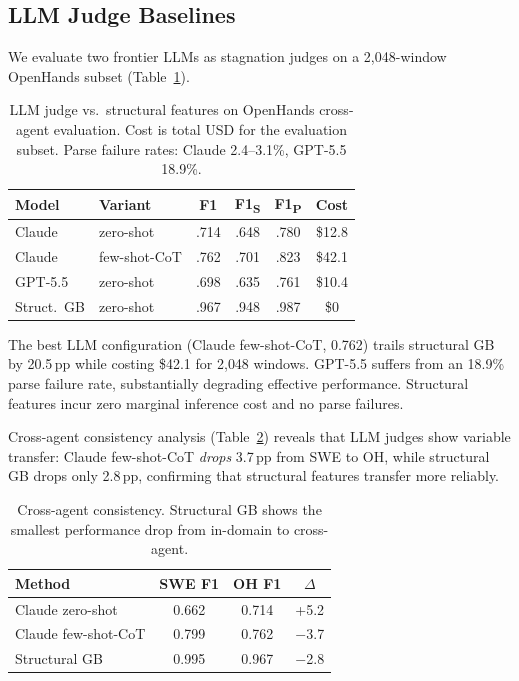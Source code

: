 \documentclass[11pt,a4paper]{article}
\begin{document}
\subsection{LLM Judge Baselines}
\label{sec:exp-llm}

We evaluate two frontier LLMs as stagnation judges on a 2{,}048-window OpenHands subset (Table~\ref{tab:llm}).

\begin{table}[t]
\centering
\small
\begin{tabular}{llcccc}
\toprule
\textbf{Model} & \textbf{Variant} & \textbf{F1} & \textbf{F1\textsubscript{S}} & \textbf{F1\textsubscript{P}} & \textbf{Cost} \\
\midrule
Claude & zero-shot & .714 & .648 & .780 & \$12.8 \\
Claude & few-shot-CoT & .762 & .701 & .823 & \$42.1 \\
GPT-5.5 & zero-shot & .698 & .635 & .761 & \$10.4 \\
\midrule
Struct.\ GB & zero-shot & .967 & .948 & .987 & \$0 \\
\bottomrule
\end{tabular}
\caption{LLM judge vs.\ structural features on OpenHands cross-agent evaluation. Cost is total USD for the evaluation subset. Parse failure rates: Claude 2.4--3.1\%, GPT-5.5 18.9\%.}
\label{tab:llm}
\end{table}

The best LLM configuration (Claude few-shot-CoT, 0.762) trails structural GB by 20.5\,pp while costing \$42.1 for 2{,}048 windows.
GPT-5.5 suffers from an 18.9\% parse failure rate, substantially degrading effective performance.
Structural features incur zero marginal inference cost and no parse failures.

Cross-agent consistency analysis (Table~\ref{tab:llm-consistency}) reveals that LLM judges show variable transfer: Claude few-shot-CoT \emph{drops} 3.7\,pp from SWE to OH, while structural GB drops only 2.8\,pp, confirming that structural features transfer more reliably.

\begin{table}[t]
\centering
\small
\begin{tabular}{lccc}
\toprule
\textbf{Method} & \textbf{SWE F1} & \textbf{OH F1} & \textbf{$\Delta$} \\
\midrule
Claude zero-shot & 0.662 & 0.714 & +5.2 \\
Claude few-shot-CoT & 0.799 & 0.762 & $-$3.7 \\
Structural GB & 0.995 & 0.967 & $-$2.8 \\
\bottomrule
\end{tabular}
\caption{Cross-agent consistency. Structural GB shows the smallest performance drop from in-domain to cross-agent.}
\label{tab:llm-consistency}
\end{table}
\end{document}
